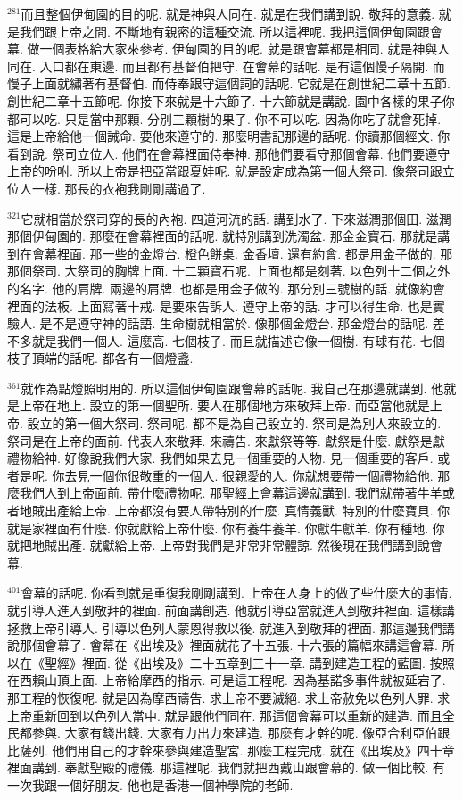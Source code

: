 \documentclass{book}
\begin{document}
$^{281}$而且整個伊甸園的目的呢.
就是神與人同在.
就是在我們講到說.
敬拜的意義.
就是我們跟上帝之間.
不斷地有親密的這種交流.
所以這裡呢.
我把這個伊甸園跟會幕.
做一個表格給大家來參考.
伊甸園的目的呢.
就是跟會幕都是相同.
就是神與人同在.
入口都在東邊.
而且都有基督伯把守.
在會幕的話呢.
是有這個慢子隔開.
而慢子上面就繡著有基督伯.
而侍奉跟守這個詞的話呢.
它就是在創世紀二章十五節.
創世紀二章十五節呢.
你接下來就是十六節了.
十六節就是講說.
園中各樣的果子你都可以吃.
只是當中那顆.
分別三顆樹的果子.
你不可以吃.
因為你吃了就會死掉.
這是上帝給他一個誡命.
要他來遵守的.
那麼明書記那邊的話呢.
你讀那個經文.
你看到說.
祭司立位人.
他們在會幕裡面侍奉神.
那他們要看守那個會幕.
他們要遵守上帝的吩咐.
所以上帝是把亞當跟夏娃呢.
就是設定成為第一個大祭司.
像祭司跟立位人一樣.
那長的衣袍我剛剛講過了.

$^{321}$它就相當於祭司穿的長的內袍.
四道河流的話.
講到水了.
下來滋潤那個田.
滋潤那個伊甸園的.
那麼在會幕裡面的話呢.
就特別講到洗濁盆.
那金金寶石.
那就是講到在會幕裡面.
那一些的金燈台.
橙色餅桌.
金香壇.
還有約會.
都是用金子做的.
那那個祭司.
大祭司的胸牌上面.
十二顆寶石呢.
上面也都是刻著.
以色列十二個之外的名字.
他的肩牌.
兩邊的肩牌.
也都是用金子做的.
那分別三號樹的話.
就像約會裡面的法板.
上面寫著十戒.
是要來告訴人.
遵守上帝的話.
才可以得生命.
也是實驗人.
是不是遵守神的話語.
生命樹就相當於.
像那個金燈台.
那金燈台的話呢.
差不多就是我們一個人.
這麼高.
七個枝子.
而且就描述它像一個樹.
有球有花.
七個枝子頂端的話呢.
都各有一個燈盞.

$^{361}$就作為點燈照明用的.
所以這個伊甸園跟會幕的話呢.
我自己在那邊就講到.
他就是上帝在地上.
設立的第一個聖所.
要人在那個地方來敬拜上帝.
而亞當他就是上帝.
設立的第一個大祭司.
祭司呢.
都不是為自己設立的.
祭司是為別人來設立的.
祭司是在上帝的面前.
代表人來敬拜.
來禱告.
來獻祭等等.
獻祭是什麼.
獻祭是獻禮物給神.
好像說我們大家.
我們如果去見一個重要的人物.
見一個重要的客戶.
或者是呢.
你去見一個你很敬重的一個人.
很親愛的人.
你就想要帶一個禮物給他.
那麼我們人到上帝面前.
帶什麼禮物呢.
那聖經上會幕這邊就講到.
我們就帶著牛羊或者地賊出產給上帝.
上帝都沒有要人帶特別的什麼.
真情義獸.
特別的什麼寶貝.
你就是家裡面有什麼.
你就獻給上帝什麼.
你有養牛養羊.
你獻牛獻羊.
你有種地.
你就把地賊出產.
就獻給上帝.
上帝對我們是非常非常體諒.
然後現在我們講到說會幕.

$^{401}$會幕的話呢.
你看到就是重復我剛剛講到.
上帝在人身上的做了些什麼大的事情.
就引導人進入到敬拜的裡面.
前面講創造.
他就引導亞當就進入到敬拜裡面.
這樣講拯救上帝引導人.
引導以色列人蒙恩得救以後.
就進入到敬拜的裡面.
那這邊我們講說那個會幕了.
會幕在《出埃及》裡面就花了十五張.
十六張的篇幅來講這會幕.
所以在《聖經》裡面.
從《出埃及》二十五章到三十一章.
講到建造工程的藍圖.
按照在西賴山頂上面.
上帝給摩西的指示.
可是這工程呢.
因為基諾多事件就被延宕了.
那工程的恢復呢.
就是因為摩西禱告.
求上帝不要滅絕.
求上帝赦免以色列人罪.
求上帝重新回到以色列人當中.
就是跟他們同在.
那這個會幕可以重新的建造.
而且全民都參與.
大家有錢出錢.
大家有力出力來建造.
那麼有才幹的呢.
像亞合利亞伯跟比薩列.
他們用自己的才幹來參與建造聖宮.
那麼工程完成.
就在《出埃及》四十章裡面講到.
奉獻聖殿的禮儀.
那這裡呢.
我們就把西戴山跟會幕的.
做一個比較.
有一次我跟一個好朋友.
他也是香港一個神學院的老師.
\end{document}
